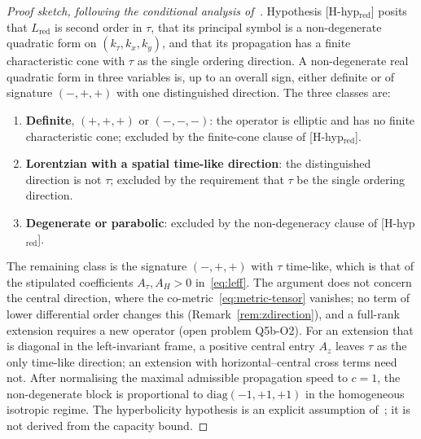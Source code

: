 \documentclass[11pt,a4paper]{article}
\theoremstyle{definition}
\theoremstyle{remark}
\begin{document}
    \begin{proof}[Proof sketch, following the conditional analysis of~{\cite{Beau2026c}}]
Hypothesis [H-hyp$_{\mathrm{red}}$] posits that $L_{\mathrm{red}}$ is second order in $\tau$, that its principal
symbol is a non-degenerate quadratic form on $(k_\tau, k_x, k_y)$, and that its propagation has a finite
characteristic cone with $\tau$ as the single ordering direction.
A non-degenerate real quadratic form in three variables is, up to an overall sign, either definite or of signature
$(-,+,+)$ with one distinguished direction.
The three classes are:
\begin{enumerate}
  \item \textbf{Definite}, $(+,+,+)$ or $(-,-,-)$: the operator is elliptic and has no finite characteristic cone;
  excluded by the finite-cone clause of [H-hyp$_{\mathrm{red}}$].
  \item \textbf{Lorentzian with a spatial time-like direction}: the distinguished direction is not $\tau$; excluded by
  the requirement that $\tau$ be the single ordering direction.
  \item \textbf{Degenerate or parabolic}: excluded by the non-degeneracy clause of [H-hyp$_{\mathrm{red}}$].
\end{enumerate}
The remaining class is the signature $(-,+,+)$ with $\tau$ time-like, which is that of the stipulated
coefficients $A_\tau, A_H > 0$ in~\eqref{eq:leff}.
The argument does not concern the central direction, where the co-metric~\eqref{eq:metric-tensor} vanishes; no term
of lower differential order changes this (Remark~\ref{rem:zdirection}), and a full-rank extension requires a new
operator (open problem Q5b-O2).
For an extension that is diagonal in the left-invariant frame, a positive central entry $A_z$ leaves $\tau$ as the
only time-like direction; an extension with horizontal--central cross terms need not.
After normalising the maximal admissible propagation speed to $c = 1$, the non-degenerate block is proportional
to $\mathrm{diag}(-1,+1,+1)$ in the homogeneous isotropic regime.
The hyperbolicity hypothesis is an explicit assumption of~\cite{Beau2026c}; it is not derived from the capacity
bound.
    \end{proof}
\end{document}
